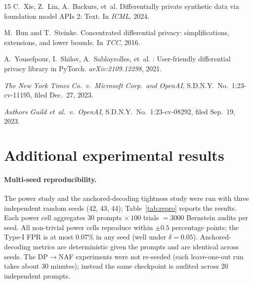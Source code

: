 \documentclass{article}
\begin{document}
\begin{thebibliography}{15}
C.~Xie, Z.~Lin, A.~Backurs, et~al.
\newblock Differentially private synthetic data via foundation model {API}s 2: Text.
\newblock In \emph{ICML}, 2024.

M.~Bun and T.~Steinke.
\newblock Concentrated differential privacy: simplifications, extensions, and lower bounds.
\newblock In \emph{TCC}, 2016.

A.~Yousefpour, I.~Shilov, A.~Sablayrolles, et~al.
: User-friendly differential privacy library in {PyTorch}.
\newblock \emph{arXiv:2109.12298}, 2021.

\emph{The New York Times Co.\ v.\ Microsoft Corp.\ and OpenAI},
\newblock S.D.N.Y.\ No.~1:23-cv-11195, filed Dec.~27, 2023.

\emph{Authors Guild et~al.\ v.\ OpenAI},
\newblock S.D.N.Y.\ No.~1:23-cv-08292, filed Sep.~19, 2023.

\end{thebibliography}


\newpage
\appendix
\section{Additional experimental results}
\label{app:additional}

\paragraph{Multi-seed reproducibility.}
\label{app:repro}
The power study and the anchored-decoding tightness study were run with three independent random seeds (42, 43, 44); Table~\ref{tab:repro} reports the results.  Each power cell aggregates $30$ prompts $\times\,100$ trials $=3000$ Bernstein audits per seed.  All non-trivial power cells reproduce within $\pm 0.5$ percentage points; the Type-I FPR is at most $0.07\%$ in any seed (well under $\delta=0.05$).  Anchored-decoding metrics are deterministic given the prompts and are identical across seeds.  The DP$\to$NAF experiments were not re-seeded (each leave-one-out run takes about $30$ minutes); instead the same checkpoint is audited across $20$ independent prompts.

\vspace{-2pt}
\begin{table}[H]
\centering
\caption{Headline numbers across three random seeds.  Power cells: rejection rates at $1{-}\delta=0.95$.  Anchored cells: fraction of prompts violating budget $K$.}
\label{tab:repro}
\scriptsize

\end{table}
\end{document}
